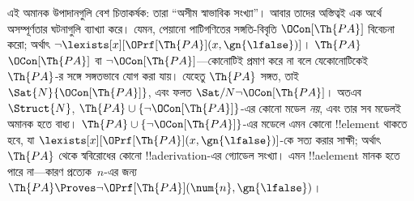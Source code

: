 \documentclass[../../../include/open-logic-section]{subfiles}
\begin{document}
এই অমানক উপাদানগুলি বেশ চিত্তাকর্ষক: তারা ``অসীম স্বাভাবিক সংখ্যা''।
আবার তাদের অস্তিত্বই এক অর্থে অসম্পূর্ণতার ঘটনাগুলি ব্যাখ্যা করে। যেমন,
পেয়ানো পাটিগণিতের সঙ্গতি-বিবৃতি $\OCon[\Th{PA}]$ বিবেচনা করো; অর্থাৎ
$\lnot \lexists[x][\OPrf[\Th{PA}](x, \gn{\lfalse})]$। $\Th{PA}$
$\OCon[\Th{PA}]$ বা $\lnot \OCon[\Th{PA}]$---কোনোটিই প্রমাণ করে না
বলে যেকোনোটিকেই $\Th{PA}$-র সঙ্গে সঙ্গতভাবে যোগ করা যায়। যেহেতু
$\Th{PA}$ সঙ্গত, তাই $\Sat{N}{\OCon[\Th{PA}]}$, এবং ফলত
$\Sat/{N}{\lnot \OCon[\Th{PA}]}$। অতএব $\Struct{N}$, $\Th{PA} \cup
\{\lnot \OCon[\Th{PA}]\}$-এর কোনো মডেল \emph{নয়}, এবং তার সব মডেলই
অমানক হতে বাধ্য। $\Th{PA} \cup \{\lnot \OCon[\Th{PA}]\}$-এর মডেলে
এমন কোনো !!{element} থাকতে হবে, যা
$\lexists[x][\OPrf[\Th{PA}](x, \gn{\lfalse})]$-কে সত্য করার সাক্ষী;
অর্থাৎ $\Th{PA}$ থেকে স্ববিরোধের কোনো !!a{derivation}-এর গ্যোডেল সংখ্যা।
এমন !!a{element} মানক হতে পারে না---কারণ প্রত্যেক~$n$-এর জন্য
$\Th{PA} \Proves \lnot \OPrf[\Th{PA}](\num{n}, \gn{\lfalse})$।
\end{document}
